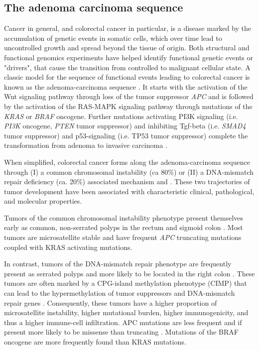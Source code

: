 \begin{flushleft}
\subsection{The adenoma carcinoma sequence}
Cancer in general, and colorectal cancer in particular, is a disease marked by the accumulation of genetic events in somatic cells, which over time lead to uncontrolled growth and spread beyond the tissue of origin. Both structural and functional genomics experiments have helped identify functional genetic events or "drivers", that cause the transition from controlled to malignant cellular state. A classic model for the sequence of functional events leading to colorectal cancer is known as the adenoma-carcinoma sequence \citep{vogelsteinGeneticAlterationsColorectaltumor1988}. It starts with the activation of the Wnt signaling pathway through loss of the tumor suppressor \textit{APC} and is followed by the activation of the RAS-MAPK signaling pathway through mutations of the \textit{KRAS} or \textit{BRAF} oncogene. Further mutations activating PI3K signaling (i.e. \textit{PI3K} oncogene, \textit{PTEN} tumor suppressor) and inhibiting Tgf-beta (i.e. \textit{SMAD4} tumor suppressor) and p53-signaling (i.e. TP53 tumor suppressor) complete the transformation from adenoma to invasive carcinoma \citep{fearonMolecularGeneticsColorectal2011}. \par

When simplified, colorectal cancer forms along the adenoma-carcinoma sequence through (I) a common chromosomal instability (ca 80\%) or (II) a DNA-mismatch repair deficiency (ca. 20\%) associated mechanism \citep{markowitzMolecularOriginsCancer2009} and \citep{pancioneGeneticEpigeneticEvents2012}. These two trajectories of tumor development have been associated with characteristic clinical, pathological, and molecular properties. 
\par

Tumors of the common chromosomal instability phenotype present themselves early as common, non-serrated polyps in the rectum and sigmoid colon \citep{markowitzMolecularOriginsCancer2009}. Most tumors are microsatellite stable and have frequent \textit{APC} truncating mutations coupled with KRAS activating mutations. 
\par 

In contrast, tumors of the DNA-mismatch repair phenotype are frequently present as serrated polyps and more likely to be located in the right colon \citep{markowitzMolecularOriginsCancer2009}. These tumors are often marked by a CPG-island methylation phenotype (CIMP) that can lead to the hypermethylation of tumor suppressors and DNA-mismatch repair genes \citep{oginoCpGIslandMethylator2009}. Consequently, these tumors have a higher proportion of microsatellite instability, higher mutational burden, higher immunogenicity, and thus a higher immune-cell infiltration. APC mutations are less frequent and if present more likely to be missense than truncating \citep{borowskyRoleAPCWNT2018}. Mutations of the BRAF oncogene are more frequently found than KRAS mutations. 
\par


\end{flushleft}
